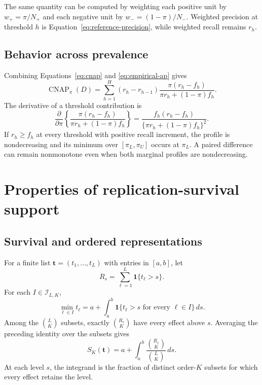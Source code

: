 \documentclass[11pt]{article}
\newcommand{\CNAP}{\operatorname{CNAP}}
\theoremstyle{remark}
\begin{document}
The same quantity can be computed by weighting each positive unit by $w_+=\pi/N_+$ and each negative unit by $w_-=(1-\pi)/N_-$. Weighted precision at threshold $h$ is Equation~\eqref{eq:reference-precision}, while weighted recall remains $r_h$.

\subsection{Behavior across prevalence}

Combining Equations~\eqref{eq:cnap} and \eqref{eq:empirical-ap} gives
\begin{equation}
\CNAP_\pi(D)
=
\sum_{h=1}^{H}
(r_h-r_{h-1})
\frac{\pi(r_h-f_h)}
{\pi r_h+(1-\pi)f_h}.
\label{eq:cnap-profile}
\end{equation}
The derivative of a threshold contribution is
\begin{equation}
\frac{\partial}{\partial\pi}
\left\{
\frac{\pi(r_h-f_h)}
{\pi r_h+(1-\pi)f_h}
\right\}
=
\frac{f_h(r_h-f_h)}
{\{\pi r_h+(1-\pi)f_h\}^2}.
\label{eq:cnap-derivative}
\end{equation}
If $r_h\geq f_h$ at every threshold with positive recall increment, the profile is nondecreasing and its minimum over $[\pi_L,\pi_U]$ occurs at $\pi_L$. A paired difference can remain nonmonotone even when both marginal profiles are nondecreasing.

\section{Properties of replication-survival support}
\label{app:support-proofs}

\subsection{Survival and ordered representations}

For a finite list $\mathbf t=(t_1,\ldots,t_L)$ with entries in $[a,b]$, let
\[
R_s=\sum_{\ell=1}^L\mathbf 1\{t_\ell>s\}.
\]
For each $I\in\mathcal I_{L,K}$,
\[
\min_{\ell\in I}t_\ell
=
a+\int_a^b\mathbf 1\{t_\ell>s\text{ for every }\ell\in I\}\,ds.
\]
Among the $\binom{L}{K}$ subsets, exactly $\binom{R_s}{K}$ have every
effect above $s$. Averaging the preceding identity over the subsets gives
\begin{equation}
S_K(\mathbf t)
=
a+\int_a^b
\frac{\binom{R_s}{K}}{\binom{L}{K}}\,ds.
\label{eq:survival-representation}
\end{equation}
At each level $s$, the integrand is the fraction of distinct order-$K$
subsets for which every effect retains the level.
\end{document}

